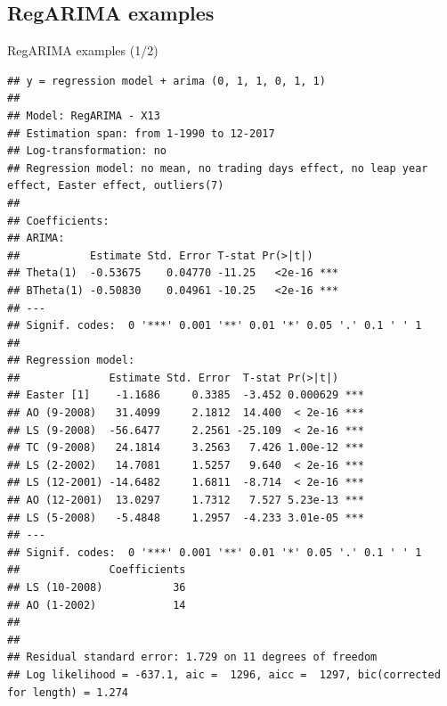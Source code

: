 \documentclass[10pt,xcolor=table,color={dvipsnames,usenames},ignorenonframetext,usepdftitle=false,french]{beamer}
\newenvironment{Shaded}{\begin{snugshade}}{\end{snugshade}}
\newcommand{\KeywordTok}[1]{\textcolor[rgb]{0.13,0.29,0.53}{\textbf{#1}}}
\newcommand{\NormalTok}[1]{#1}
\newcommand{\OperatorTok}[1]{\textcolor[rgb]{0.81,0.36,0.00}{\textbf{#1}}}
\begin{document}
\hypertarget{regarima-examples}{%
\subsection{RegARIMA examples}\label{regarima-examples}}

\begin{frame}[fragile]{RegARIMA examples (1/2)}
\protect\hypertarget{regarima-examples-12}{}

\footnotesize

\begin{Shaded}
\end{Shaded}

\begin{verbatim}
## y = regression model + arima (0, 1, 1, 0, 1, 1)
## 
## Model: RegARIMA - X13
## Estimation span: from 1-1990 to 12-2017
## Log-transformation: no
## Regression model: no mean, no trading days effect, no leap year effect, Easter effect, outliers(7)
## 
## Coefficients:
## ARIMA: 
##           Estimate Std. Error T-stat Pr(>|t|)    
## Theta(1)  -0.53675    0.04770 -11.25   <2e-16 ***
## BTheta(1) -0.50830    0.04961 -10.25   <2e-16 ***
## ---
## Signif. codes:  0 '***' 0.001 '**' 0.01 '*' 0.05 '.' 0.1 ' ' 1
## 
## Regression model: 
##              Estimate Std. Error  T-stat Pr(>|t|)    
## Easter [1]    -1.1686     0.3385  -3.452 0.000629 ***
## AO (9-2008)   31.4099     2.1812  14.400  < 2e-16 ***
## LS (9-2008)  -56.6477     2.2561 -25.109  < 2e-16 ***
## TC (9-2008)   24.1814     3.2563   7.426 1.00e-12 ***
## LS (2-2002)   14.7081     1.5257   9.640  < 2e-16 ***
## LS (12-2001) -14.6482     1.6811  -8.714  < 2e-16 ***
## AO (12-2001)  13.0297     1.7312   7.527 5.23e-13 ***
## LS (5-2008)   -5.4848     1.2957  -4.233 3.01e-05 ***
## ---
## Signif. codes:  0 '***' 0.001 '**' 0.01 '*' 0.05 '.' 0.1 ' ' 1
##              Coefficients
## LS (10-2008)           36
## AO (1-2002)            14
## 
## 
## Residual standard error: 1.729 on 11 degrees of freedom
## Log likelihood = -637.1, aic =  1296, aicc =  1297, bic(corrected for length) = 1.274
\end{verbatim}

\end{frame}
\end{document}
